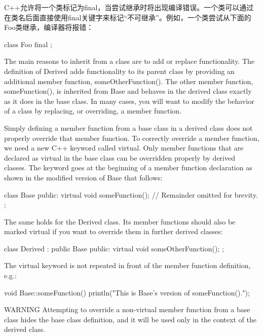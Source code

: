 
C++允许将一个类标记为final，当尝试继承时将出现编译错误。一个类可以通过在类名后面直接使用final关键字来标记“不可继承”。例如，一个类尝试从下面的Foo类继承，编译器将报错：

\begin{cpp}
class Foo final { };
\end{cpp}


The main reasons to inherit from a class are to add or replace functionality. The definition of Derived adds functionality to its parent class by providing an additional member function, someOtherFunction(). The other member function, someFunction(), is inherited from Base and behaves in the derived class exactly as it does in the base class. In many cases, you will want to modify the behavior of a class by replacing, or overriding, a member function.


Simply defining a member function from a base class in a derived class does not properly override that member function. To correctly override a member function, we need a new C++ keyword called virtual. Only member functions that are declared as virtual in the base class can be overridden properly by derived classes. The keyword goes at the beginning of a member function declaration as shown in the modified version of Base that follows:

\begin{cpp}
class Base
{
    public:
        virtual void someFunction();
        // Remainder omitted for brevity.
};
\end{cpp}

The same holds for the Derived class. Its member functions should also be marked virtual if you want to override them in further derived classes:

\begin{cpp}
class Derived : public Base
{
    public:
        virtual void someOtherFunction();
};
\end{cpp}

The virtual keyword is not repeated in front of the member function definition, e.g.:

\begin{cpp}
void Base::someFunction()
{
    println("This is Base's version of someFunction().");
}
\end{cpp}

\begin{myWarning}{WARNING}
Attempting to override a non-virtual member function from a base class hides the base class definition, and it will be used only in the context of the derived class.
\end{myWarning}


